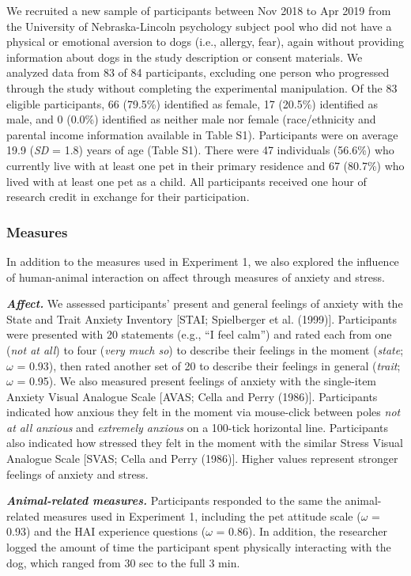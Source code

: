 \documentclass[
  english,
  pub,floatsintext]{apa6}
\begin{document}
We recruited a new sample of participants between Nov 2018 to Apr 2019 from the University of Nebraska-Lincoln psychology subject pool who did not have a physical or emotional aversion to dogs (i.e., allergy, fear), again without providing information about dogs in the study description or consent materials. We analyzed data from 83 of 84 participants, excluding one person who progressed through the study without completing the experimental manipulation. Of the 83 eligible participants, 66 (79.5\%) identified as female, 17 (20.5\%) identified as male, and 0 (0.0\%) identified as neither male nor female (race/ethnicity and parental income information available in Table S1). Participants were on average 19.9 (\emph{SD} = 1.8) years of age (Table S1). There were 47 individuals (56.6\%) who currently live with at least one pet in their primary residence and 67 (80.7\%) who lived with at least one pet as a child. All participants received one hour of research credit in exchange for their participation.

\hypertarget{measures-1}{%
\subsubsection{Measures}\label{measures-1}}

In addition to the measures used in Experiment 1, we also explored the influence of human-animal interaction on affect through measures of anxiety and stress.

\textbf{\emph{Affect.}}
We assessed participants' present and general feelings of anxiety with the State and Trait Anxiety Inventory {[}STAI; Spielberger et al. (1999){]}. Participants were presented with 20 statements (e.g., ``I feel calm'') and rated each from one (\emph{not at all}) to four (\emph{very much so}) to describe their feelings in the moment (\emph{state}; \(\omega\) = 0.93), then rated another set of 20 to describe their feelings in general (\emph{trait}; \(\omega\) = 0.95). We also measured present feelings of anxiety with the single-item Anxiety Visual Analogue Scale {[}AVAS; Cella and Perry (1986){]}. Participants indicated how anxious they felt in the moment via mouse-click between poles \emph{not at all anxious} and \emph{extremely anxious} on a 100-tick horizontal line. Participants also indicated how stressed they felt in the moment with the similar Stress Visual Analogue Scale {[}SVAS; Cella and Perry (1986){]}. Higher values represent stronger feelings of anxiety and stress.

\textbf{\emph{Animal-related measures.}}
Participants responded to the same the animal-related measures used in Experiment 1, including the pet attitude scale (\(\omega\) = 0.93) and the HAI experience questions (\(\omega\) = 0.86). In addition, the researcher logged the amount of time the participant spent physically interacting with the dog, which ranged from 30 sec to the full 3 min.
\end{document}
